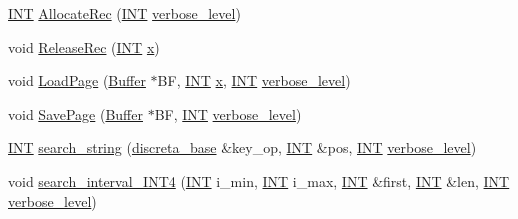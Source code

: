 \begin{DoxyCompactItemize}
\mbox{\hyperlink{galois_8h_a09fddde158a3a20bd2dcadb609de11dc}{I\+NT}} \mbox{\hyperlink{classbtree_afc6388f3da9703ee6cd576bd48fe5264}{Allocate\+Rec}} (\mbox{\hyperlink{galois_8h_a09fddde158a3a20bd2dcadb609de11dc}{I\+NT}} \mbox{\hyperlink{simeon_8_c_a818073fbcc2f439e7c56952f67386122}{verbose\+\_\+level}})
\item 
void \mbox{\hyperlink{classbtree_af3f884e7086d0695b0f1706622a74756}{Release\+Rec}} (\mbox{\hyperlink{galois_8h_a09fddde158a3a20bd2dcadb609de11dc}{I\+NT}} \mbox{\hyperlink{alphabet2_8_c_a6150e0515f7202e2fb518f7206ed97dc}{x}})
\item 
void \mbox{\hyperlink{classbtree_a29d23b8b151b6b793aa1184ca6ccc947}{Load\+Page}} (\mbox{\hyperlink{discreta_8h_a4966414b761cd8d10ba385fe5e7c07fc}{Buffer}} $\ast$BF, \mbox{\hyperlink{galois_8h_a09fddde158a3a20bd2dcadb609de11dc}{I\+NT}} \mbox{\hyperlink{alphabet2_8_c_a6150e0515f7202e2fb518f7206ed97dc}{x}}, \mbox{\hyperlink{galois_8h_a09fddde158a3a20bd2dcadb609de11dc}{I\+NT}} \mbox{\hyperlink{simeon_8_c_a818073fbcc2f439e7c56952f67386122}{verbose\+\_\+level}})
\item 
void \mbox{\hyperlink{classbtree_a2dd55fa54a2db4dfd5746d2f27835e26}{Save\+Page}} (\mbox{\hyperlink{discreta_8h_a4966414b761cd8d10ba385fe5e7c07fc}{Buffer}} $\ast$BF, \mbox{\hyperlink{galois_8h_a09fddde158a3a20bd2dcadb609de11dc}{I\+NT}} \mbox{\hyperlink{simeon_8_c_a818073fbcc2f439e7c56952f67386122}{verbose\+\_\+level}})
\item 
\mbox{\hyperlink{galois_8h_a09fddde158a3a20bd2dcadb609de11dc}{I\+NT}} \mbox{\hyperlink{classbtree_a683397734819951c911ba7f5c35c8fac}{search\+\_\+string}} (\mbox{\hyperlink{classdiscreta__base}{discreta\+\_\+base}} \&key\+\_\+op, \mbox{\hyperlink{galois_8h_a09fddde158a3a20bd2dcadb609de11dc}{I\+NT}} \&pos, \mbox{\hyperlink{galois_8h_a09fddde158a3a20bd2dcadb609de11dc}{I\+NT}} \mbox{\hyperlink{simeon_8_c_a818073fbcc2f439e7c56952f67386122}{verbose\+\_\+level}})
\item 
void \mbox{\hyperlink{classbtree_a8a89cbed12d4ac832d89dcc16dc6dcf2}{search\+\_\+interval\+\_\+\+I\+N\+T4}} (\mbox{\hyperlink{galois_8h_a09fddde158a3a20bd2dcadb609de11dc}{I\+NT}} i\+\_\+min, \mbox{\hyperlink{galois_8h_a09fddde158a3a20bd2dcadb609de11dc}{I\+NT}} i\+\_\+max, \mbox{\hyperlink{galois_8h_a09fddde158a3a20bd2dcadb609de11dc}{I\+NT}} \&first, \mbox{\hyperlink{galois_8h_a09fddde158a3a20bd2dcadb609de11dc}{I\+NT}} \&len, \mbox{\hyperlink{galois_8h_a09fddde158a3a20bd2dcadb609de11dc}{I\+NT}} \mbox{\hyperlink{simeon_8_c_a818073fbcc2f439e7c56952f67386122}{verbose\+\_\+level}})
\item 

\end{DoxyCompactItemize}
